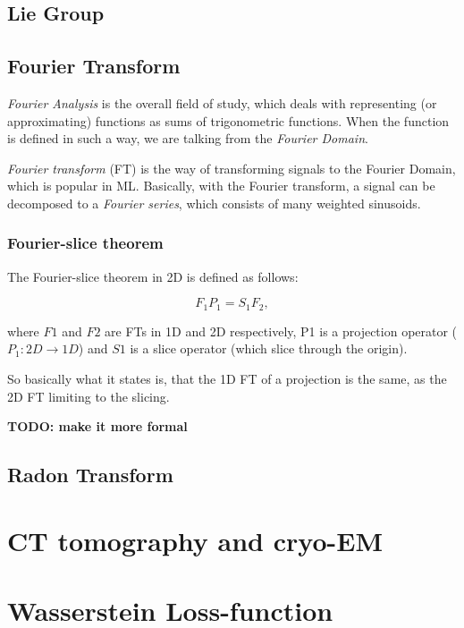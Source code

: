 \subsection{Lie Group}

\subsection{Fourier Transform}
\textit{Fourier Analysis} is the overall field of study, which deals with representing (or approximating) functions as 
sums of trigonometric functions. When the function is defined in such a way, we are talking from the \textit{Fourier Domain}.

\textit{Fourier transform} (FT) is the way of transforming signals to the Fourier Domain, which is popular in ML.
Basically, with the Fourier transform, a signal can be decomposed to a \textit{Fourier series}, which consists of many weighted sinusoids. 


\subsubsection{Fourier-slice theorem}
The Fourier-slice theorem \cite{fourierSliceTheorem} in 2D is defined as follows:

\begin{equation}
    \label{eq:Fourrier-slice}
    F_1 P_1 = S_1 F_2,
\end{equation}

where $F1$ and $F2$ are FTs in 1D and 2D respectively, P1 is a projection operator ($P_1 : 2D \rightarrow 1D$) and $S1$ is a slice operator 
(which slice through the origin).

So basically what it states is, that the 1D FT of a projection is the same, as the 2D FT limiting to the slicing.

\textbf{TODO: make it more formal}


\subsection{Radon Transform}

\section{CT tomography and cryo-EM}

\section{Wasserstein Loss-function}

